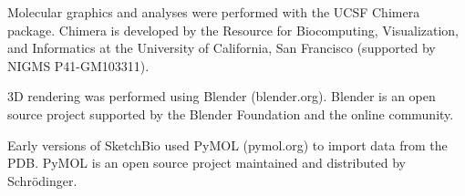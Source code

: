 \documentclass[twocolumn]{bmcart}%
\begin{document}
Molecular graphics and analyses were performed with the UCSF Chimera package.
Chimera is developed by the Resource for Biocomputing, Visualization, and Informatics at the University of California, San Francisco (supported by NIGMS P41-GM103311).

3D rendering was performed using Blender (blender.org).
Blender is an open source project supported by the Blender Foundation and the online community.

Early versions of SketchBio used PyMOL (pymol.org) to import data from the PDB.
PyMOL is an open source project maintained and distributed by Schrödinger.

\end{document}
